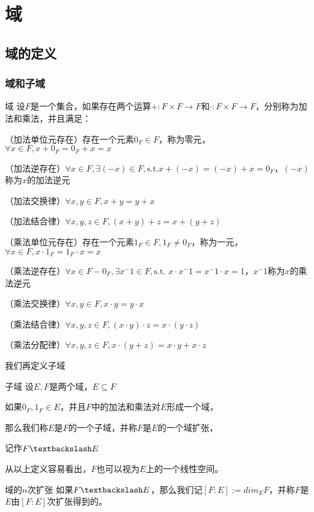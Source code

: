 \documentclass[12pt, a4paper, oneside, UTF8]{ctexbook}
\begin{document}
% 
\else
\fi
\chapter{域}
	\section{域的定义}
		\subsection{域和子域}
			\begin{defn}{域}{}
				设$F$是一个集合，如果存在两个运算$+:F \times F \rightarrow F$和$\cdot :F \times F \rightarrow F$，分别称为加法和乘法，并且满足：
				
				（加法单位元存在）存在一个元素$0_F \in F$，称为零元，$\forall x \in F,x+0_F=0_F+x=x$
				
				（加法逆存在）$ \forall x \in F,\exists (-x) \in F,\text{s.t.}x+(-x)=(-x)+x=0_F$，$(-x)$称为$x$的加法逆元
				
				（加法交换律）$\forall x,y \in F,x+y = y+x$
				
				（加法结合律）$\forall x,y,z \in F,(x+y)+z = x+(y+z)$
				
				（乘法单位元存在）存在一个元素$1_F \in F,1_F \neq 0_F$，称为一元，$\forall x \in F,x\cdot 1_F=1_F \cdot x = x$
				
				（乘法逆存在）$\forall x \in F-{0_F},\exists x^-1 \in F,\text{s.t. }x\cdot x^-1=x^-1 \cdot x = 1$，$x^-1$称为$x$的乘法逆元
				
				（乘法交换律）$\forall x,y \in F,x\cdot y = y\cdot x$
				
				（乘法结合律）$\forall x,y,z \in F,(x\cdot y)\cdot z = x\cdot (y\cdot z)$
				
				（乘法分配律）$\forall x,y,z \in F,x\cdot(y+z)=x\cdot y+x\cdot z$
			\end{defn}
			我们再定义子域
			\begin{defn}{子域}{}
				设$E,F$是两个域，$E \subseteq F$
				
				如果$0_F,1_F \in E$，并且$F$中的加法和乘法对$E$形成一个域，
				
				那么我们称$E$是$F$的一个子域，并称$F$是$E$的一个域扩张，
				
				记作$F\textbackslash E$
			\end{defn}
			从以上定义容易看出，$F$也可以视为$E$上的一个线性空间。
			\begin{defn}{域的$n$次扩张}{}
				如果$F\textbackslash E$，那么我们记$[F:E]:=dim_E F$，并称$F$是$E$由$[F:E]$次扩张得到的。
			\end{defn}
\end{document}
